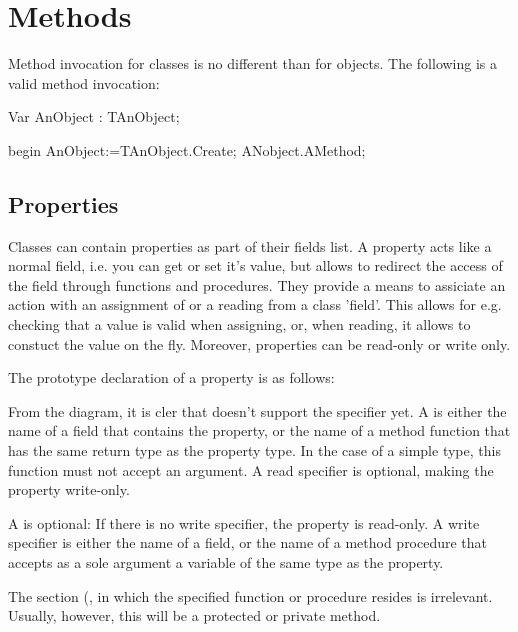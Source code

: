 \documentclass{report}
\begin{document}
\section{Methods}

Method invocation for classes is no different than for objects. The
following is a valid method invocation:
\begin{listing}
Var  AnObject : TAnObject;

begin
  AnObject:=TAnObject.Create;
  ANobject.AMethod;
\end{listing}

\subsection{Properties}

Classes can contain properties as part of their fields list. A property
acts like a normal field, i.e. you can get or set it's value, but 
allows to redirect the access of the field through functions and 
procedures. They provide a means to assiciate an action with an assignment
of or a reading from a class 'field'. This allows for e.g. checking that a
value is valid when assigning, or, when reading, it allows to constuct the
value on the fly. Moreover, properties can be read-only or write only.

The prototype declaration of a property is as follows:


From the diagram, it is cler that \fpc doesn't support the 
specifier yet.
A  is either the name of a field that contains the
property, or the name of a method function that has the same return type as 
the property type. In the case of a simple type, this
function must not accept an argument. A read specifier is optional, making
the property write-only.

A  is optional: If there is no write specifier, the
property is read-only. A write specifier is either the name of a field, or
the name of a method procedure that accepts as a sole argument a variable of
the same type as the property.

The section (,  in which the specified function or 
procedure resides is irrelevant. Usually, however, this will be a protected
or private method.
\end{document}

